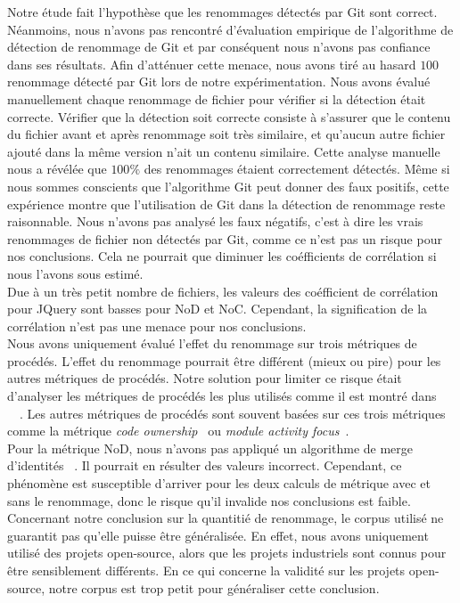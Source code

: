 Notre étude fait l'hypothèse que les renommages détectés par Git sont correct. Néanmoins, nous n'avons pas rencontré d'évaluation empirique de l'algorithme de détection de renommage de Git et par conséquent nous n'avons pas confiance dans ses résultats. Afin d'atténuer cette menace, nous avons tiré au hasard $100$ renommage détecté par Git lors de notre expérimentation. Nous avons évalué manuellement chaque renommage de fichier pour vérifier si la détection était correcte. Vérifier que la détection soit correcte consiste à s'assurer que le contenu du fichier avant et après renommage soit très similaire, et qu'aucun autre fichier ajouté dans la même version n'ait un contenu similaire. Cette analyse manuelle nous a révélée que  $100\%$ des renommages étaient correctement détectés. Même si nous sommes conscients que l'algorithme Git peut donner des faux positifs, cette expérience montre que l'utilisation de Git dans la détection de renommage reste raisonnable. Nous n'avons pas analysé les faux négatifs, c'est à dire les vrais renommages de fichier non détectés par Git, comme ce n'est pas un risque pour nos conclusions. Cela ne pourrait que diminuer les coéfficients de corrélation si nous l'avons sous estimé.\\  

 Due à un très petit nombre de fichiers, les valeurs des coéfficient de corrélation pour JQuery sont basses pour NoD et NoC. Cependant, la signification de la corrélation n'est pas une menace pour nos conclusions.\\

Nous avons uniquement évalué l'effet du renommage sur trois métriques de procédés. L'effet du renommage pourrait être différent (mieux ou pire) pour les autres métriques de procédés. Notre solution pour limiter ce risque était d'analyser les métriques de procédés les plus utilisés comme il est montré dans ~~\cite{radjenovic_software_2013}. Les autres métriques de procédés sont souvent basées sur ces trois métriques comme la métrique \emph{code ownership}~\cite{bird_dont_2011} ou \emph{module activity focus}~\cite{posnett_dual_2013}.\\

Pour la métrique NoD, nous n'avons pas appliqué un algorithme de merge d'identités ~\cite{goeminne_comparison_2013}. Il pourrait en résulter des valeurs incorrect. Cependant, ce phénomène est susceptible d'arriver pour les deux calculs de métrique avec et sans le renommage, donc le risque qu'il invalide nos conclusions est faible.\\

Concernant notre conclusion sur la quantitié de renommage, le corpus utilisé ne guarantit pas qu'elle puisse être généralisée. En effet, nous avons uniquement utilisé des projets open-source, alors que les projets industriels sont connus pour être sensiblement différents. En ce qui concerne la validité sur les projets open-source, notre corpus est trop petit pour généraliser cette conclusion.\\
